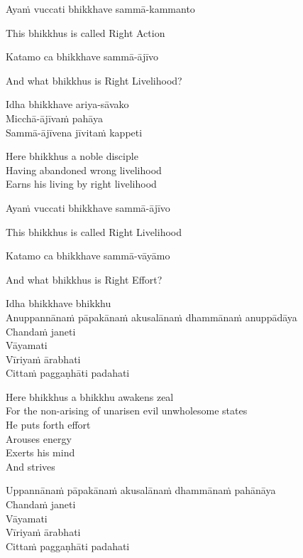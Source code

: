 Ayaṁ vuccati bhikkhave sammā-kammanto

\begin{cprenglish}
  This bhikkhus is called Right Action
\end{cprenglish}

Katamo ca bhikkhave sammā-ājīvo

\begin{cprenglish}
  And what bhikkhus is Right Livelihood?
\end{cprenglish}

Idha bhikkhave ariya-sāvako\\
Micchā-ājīvaṁ pahāya\\
Sammā-ājīvena jīvitaṁ kappeti

\begin{cprenglish}
  Here bhikkhus a noble disciple\\
  Having abandoned wrong livelihood\\
  Earns his living by right livelihood
\end{cprenglish}

Ayaṁ vuccati bhikkhave sammā-ājīvo

\begin{cprenglish}
  This bhikkhus is called Right Livelihood
\end{cprenglish}

Katamo ca bhikkhave sammā-vāyāmo

\begin{cprenglish}
  And what bhikkhus is Right Effort?
\end{cprenglish}

Idha bhikkhave bhikkhu\\
Anuppannānaṁ pāpakānaṁ akusalānaṁ dhammānaṁ anuppādāya\\
Chandaṁ janeti\\
Vāyamati\\
Vīriyaṁ ārabhati\\
Cittaṁ paggaṇhāti padahati

\begin{cprenglish}
  Here bhikkhus a bhikkhu awakens zeal\\
  For the non-arising of unarisen evil unwholesome states\\
  He puts forth effort\\
  Arouses energy\\
  Exerts his mind\\
  And strives
\end{cprenglish}

Uppannānaṁ pāpakānaṁ akusalānaṁ dhammānaṁ pahānāya\\
Chandaṁ janeti\\
Vāyamati\\
Vīriyaṁ ārabhati\\
Cittaṁ paggaṇhāti padahati

